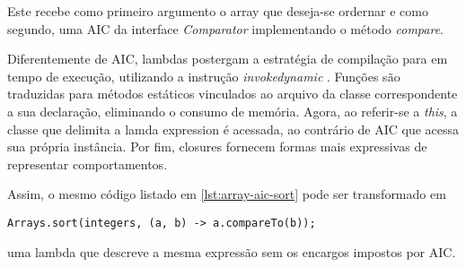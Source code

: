 \documentclass[10pt, conference]{IEEEtran}
\begin{document}
Este recebe como primeiro argumento o array que deseja-se ordernar e como segundo, uma AIC da interface \textit{Comparator} implementando o método \textit{compare}.

Diferentemente de AIC, lambdas postergam a estratégia de compilação para em tempo de execução, utilizando a instrução \textit{invokedynamic} \cite{goetz2012translation}. Funções são traduzidas para métodos estáticos vinculados ao arquivo da classe correspondente a sua declaração, eliminando o consumo de memória. Agora, ao referir-se a \textit{this}, a classe que delimita a lamda expression é acessada, ao contrário de AIC que acessa sua própria instância. Por fim, closures fornecem formas mais expressivas de representar comportamentos.

Assim, o mesmo código listado em \ref{lst:array-aic-sort} pode ser transformado em

\begin{lstlisting}[caption={Lambda Expressions}]
Arrays.sort(integers, (a, b) -> a.compareTo(b));
\end{lstlisting}

uma lambda que descreve a mesma expressão sem os encargos impostos por AIC.



\end{document}
